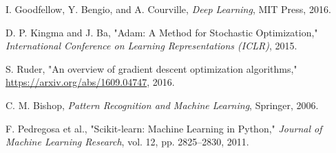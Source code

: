 \documentclass[12pt]{article}
\begin{document}
\begin{thebibliography}{9}

I. Goodfellow, Y. Bengio, and A. Courville, 
\textit{Deep Learning}, 
MIT Press, 2016.

D. P. Kingma and J. Ba, 
"Adam: A Method for Stochastic Optimization," 
\textit{International Conference on Learning Representations (ICLR)}, 2015.

S. Ruder, 
"An overview of gradient descent optimization algorithms," 
\url{https://arxiv.org/abs/1609.04747}, 2016.

C. M. Bishop, 
\textit{Pattern Recognition and Machine Learning}, 
Springer, 2006.

F. Pedregosa et al., 
"Scikit-learn: Machine Learning in Python," 
\textit{Journal of Machine Learning Research}, vol. 12, pp. 2825–2830, 2011.

\end{thebibliography}
\end{document}
